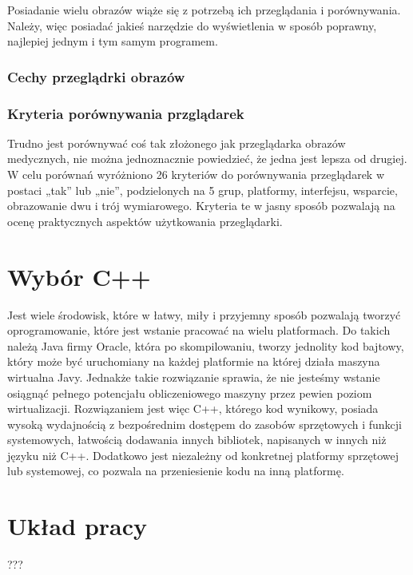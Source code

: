 Posiadanie wielu obrazów wiąże się z potrzebą ich przeglądania i porównywania.
Należy, więc posiadać jakieś narzędzie do wyświetlenia w sposób poprawny, najlepiej jednym i tym samym programem.


\subsubsection{Cechy przeglądrki obrazów}

\subsubsection{Kryteria porównywania przglądarek}

Trudno jest porównywać coś tak złożonego jak przeglądarka obrazów medycznych, nie można jednoznacznie powiedzieć, że jedna jest lepsza od drugiej.
W celu porównań wyróżniono 26 kryteriów do porównywania przeglądarek w postaci „tak” lub „nie”, podzielonych na 5 grup, platformy, interfejsu, wsparcie, obrazowanie dwu i trój wymiarowego.
Kryteria te w jasny sposób pozwalają na ocenę praktycznych aspektów użytkowania przeglądarki.


\section{Wybór C++}


Jest wiele środowisk, które w łatwy, miły i przyjemny sposób pozwalają tworzyć oprogramowanie, które jest wstanie pracować na wielu platformach.
Do takich należą Java firmy Oracle, która po skompilowaniu, tworzy jednolity kod bajtowy, który może być uruchomiany na każdej platformie na której działa maszyna wirtualna Javy.
Jednakże takie rozwiązanie sprawia, że nie jesteśmy wstanie osiągnąć pełnego potencjału obliczeniowego maszyny przez pewien poziom wirtualizacji.
Rozwiązaniem jest więc C++, którego kod wynikowy, posiada wysoką wydajnością z bezpośrednim dostępem do zasobów sprzętowych i funkcji systemowych, łatwością dodawania innych bibliotek, napisanych w innych niż języku niż C++.
Dodatkowo jest niezależny od konkretnej platformy sprzętowej lub systemowej, co pozwala na przeniesienie kodu na inną platformę.

\section{Układ pracy}

???